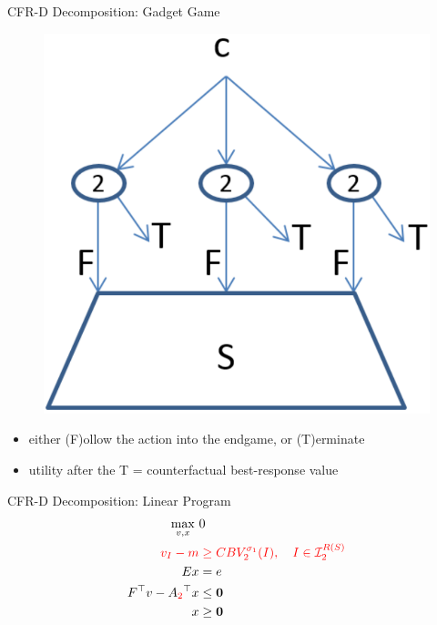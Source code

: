 \documentclass{beamer}
\theoremstyle{definition}
\newcommand{\vect}[1]{\boldsymbol{#1}}
\newcommand{\I}{\mathcal{I}}
\begin{document}
  {
    \begin{frame}{CFR-D Decomposition: Gadget Game}
      \begin{figure}[H]
        \centering
        \includegraphics[width=.4\textwidth]{../img/re-solving-game-gadget.png}
      \end{figure}
      \pause

      \begin{itemize}[<+- | alert@+>]
        \item either (F)ollow the action into the endgame, or (T)erminate
        \item utility after the T = counterfactual best-response value
      \end{itemize}
    \end{frame}

    \begin{frame}{CFR-D Decomposition: Linear Program}
      \begin{equation*}
        \label{lp:cfr-d}
        \begin{split}
          \max_{v, x}\ &0 \\
          \color{red}
          v_I - m &
          \color{red}
          \ge CBV_2^{\sigma_1}(I), \quad I \in \I_2^{R(S)}\\ 
          Ex &= e \\
          F^\top v - A_{\color{red}2}^\top x &\le \vect{0} \\
          x &\ge \vect{0}
        \end{split}
      \end{equation*}

    \end{frame}
  }
\end{document}
